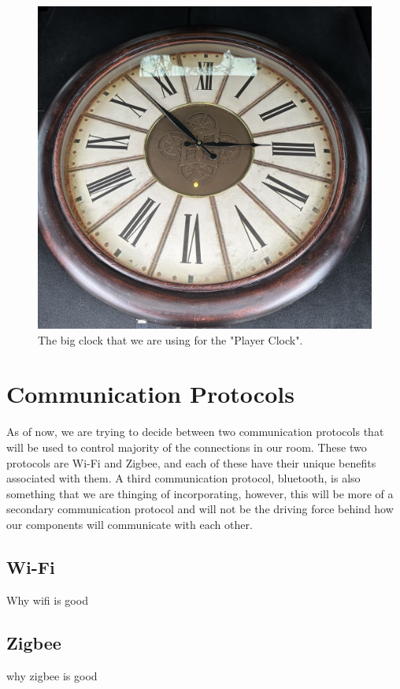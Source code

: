 \documentclass[conference]{IEEEtran}
\begin{document}
\begin{figure}[ht]
    \centering
    \includegraphics[width=0.85\columnwidth]{Images/big-clock.jpg}
    \caption{The big clock that we are using for the "Player Clock".}
\end{figure}

\section{Communication Protocols}
As of now, we are trying to decide between two communication protocols that will be used
to control majority of the connections in our room. These two protocols are Wi-Fi and Zigbee,
and each of these have their unique benefits associated with them. A third communication
protocol, bluetooth, is also something that we are thinging of incorporating, however, this
will be more of a secondary communication protocol and will not be the driving force behind
how our components will communicate with each other.

\subsection*{Wi-Fi}
Why wifi is good

\subsection*{Zigbee}
why zigbee is good
\end{document}
